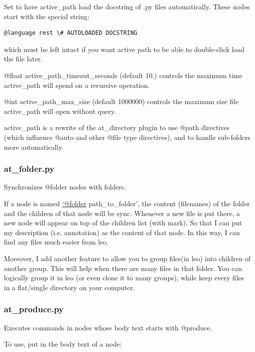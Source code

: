\documentclass[a4paper,10pt,english]{sphinxmanual}
\begin{document}
Set  to have active\_path load the docstring
of .py files automatically.  These nodes start with the special string:

\begin{Verbatim}[commandchars=\\\{\}]
@language rest \# AUTOLOADED DOCSTRING
\end{Verbatim}

which must be left intact if you want active path to be able to double-click load
the file later.

@float active\_path\_timeout\_seconds (default 10.) controls the maximum
time active\_path will spend on a recursive operation.

@int active\_path\_max\_size (default 1000000) controls the maximum
size file active\_path will open without query.

active\_path is a rewrite of the at\_directory plugin to use @path directives
(which influence @auto and other @file type directives), and to handle
sub-folders more automatically.


\subsubsection{at\_folder.py}
\label{plugins:at-folder-py}
Synchronizes @folder nodes with folders.

If a node is named \href{mailto:'@folder}{`@folder} path\_to\_folder', the content (filenames) of the
folder and the children of that node will be sync. Whenever a new file is put
there, a new node will appear on top of the children list (with mark). So that
I can put my description (i.e. annotation) as the content of that node. In this
way, I can find any files much easier from leo.

Moreover, I add another feature to allow you to group files(in leo) into
children of another group. This will help when there are many files in that
folder. You can logically group it in leo (or even clone it to many groups),
while keep every files in a flat/single directory on your computer.


\subsubsection{at\_produce.py}
\label{plugins:at-produce-py}
Executes commands in nodes whose body text starts with @produce.

To use, put in the body text of a node:
\end{document}
